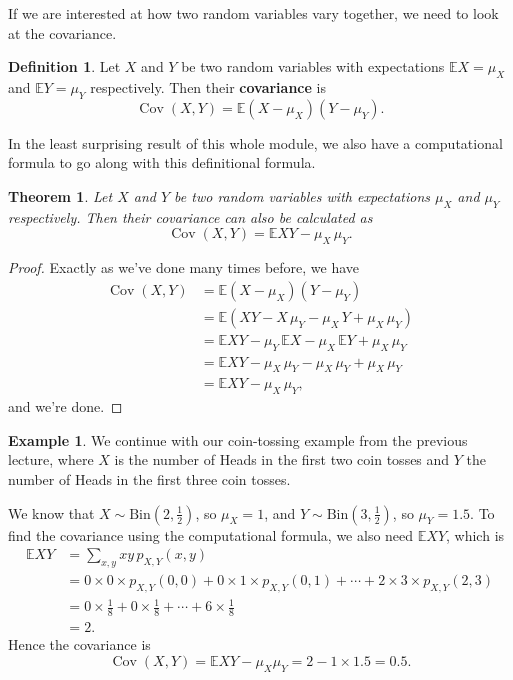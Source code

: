 \documentclass[
  a4paper,
]{book}
\newtheorem{theorem}{Theorem}[chapter]
\theoremstyle{definition}
\newtheorem{definition}{Definition}[chapter]
\theoremstyle{definition}
\newtheorem{example}{Example}[chapter]
\theoremstyle{definition}
\theoremstyle{definition}
\theoremstyle{remark}
\begin{document}
If we are interested at how two random variables vary together, we need to look at the covariance.

\begin{definition}
Let \(X\) and \(Y\) be two random variables with expectations \(\mathbb EX =\mu_X\) and \(\mathbb EY = \mu_Y\) respectively. Then their \textbf{covariance} is
\[ \operatorname{Cov}(X,Y) = \mathbb E(X - \mu_X)(Y - \mu_Y) . \]
\end{definition}

In the least surprising result of this whole module, we also have a computational formula to go along with this definitional formula.

\begin{theorem}
Let \(X\) and \(Y\) be two random variables with expectations \(\mu_X\) and \(\mu_Y\) respectively. Then their covariance can also be calculated as
\[ \operatorname{Cov}(X,Y) = \mathbb EXY - \mu_X\, \mu_Y . \]
\end{theorem}

\begin{proof}
Exactly as we've done many times before, we have
\begin{align*}
\operatorname{Cov}(X,Y) &= \mathbb E(X - \mu_X)(Y - \mu_Y) \\
&= \mathbb E(XY - X\,\mu_Y - \mu_X\, Y + \mu_X\,\mu_Y) \\
&= \mathbb EXY  - \mu_Y \,\mathbb EX - \mu_X \,\mathbb EY + \mu_X \, \mu_Y \\
&= \mathbb EXY - \mu_X \, \mu_Y - \mu_X \, \mu_Y + \mu_X \, \mu_Y \\
&= \mathbb EXY - \mu_X \, \mu_Y ,
\end{align*}
and we're done.
\end{proof}

\begin{example}
We continue with our coin-tossing example from the previous lecture, where \(X\) is the number of Heads in the first two coin tosses and \(Y\) the number of Heads in the first three coin tosses.

We know that \(X \sim \text{Bin}(2, \frac12)\), so \(\mu_X = 1\), and \(Y \sim \text{Bin}(3, \frac12)\), so \(\mu_Y = 1.5\). To find the covariance using the computational formula, we also need \(\mathbb EXY\), which is
\begin{align*}
\mathbb EXY &= \sum_{x,y} xy\, p_{X,Y}(x,y) \\
  &= 0\times 0\times p_{X,Y}(0,0) + 0 \times 1 \times p_{X,Y}(0,1) + \cdots + 2\times 3 \times p_{X,Y}(2,3) \\
  &= 0 \times \tfrac18 + 0 \times \tfrac18 + \cdots + 6 \times \tfrac18 \\
  &= 2.
\end{align*}
Hence the covariance is
\[ \operatorname{Cov}(X,Y) = \mathbb EXY - \mu_X\mu_Y = 2 - 1 \times 1.5 = 0.5 .\]
\end{example}
\end{document}
